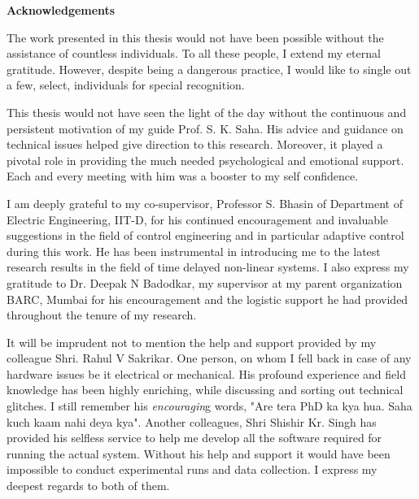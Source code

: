 \doublespacing
\newpage
\thispagestyle{empty}
\mbox{}

\newpage
\thispagestyle{empty}

\begin{center}
\textbf{\Large{Acknowledgements}}
\bigskip
\bigskip
\end{center}

The work presented in this thesis would not have been possible without the assistance
of countless individuals.  To all these people, I extend my eternal gratitude. However, despite being a dangerous practice, I would like to single out a few, select, individuals for special recognition.

 This thesis would not have seen the light of the day without the continuous and persistent motivation of my guide Prof. S. K. Saha. His advice and guidance  on technical  issues helped give direction to this research. Moreover, it played a pivotal role in providing the much needed psychological and emotional support. Each and every meeting with him was a booster to my self confidence. 
 
    
I am deeply grateful to my co-supervisor, Professor S. Bhasin of Department of Electric Engineering, IIT-D, for his continued encouragement and invaluable suggestions in the field of control engineering and in particular adaptive control during this work. He has been instrumental in introducing me to the latest research results  in the field of time delayed non-linear systems.  
I also express my gratitude to Dr. Deepak N Badodkar, my supervisor at my parent organization BARC, Mumbai for his encouragement and the logistic support he had provided throughout the tenure of my research.   


It will be imprudent not to mention the help and support provided by my colleague Shri. Rahul V Sakrikar. One person, on whom I fell back in case of any hardware issues be it electrical or mechanical. His profound experience and field knowledge has been highly enriching,  while discussing and sorting out technical glitches. I still remember his \textit{encouragin}g words, "Are tera PhD ka kya hua. Saha kuch kaam nahi deya kya". Another colleagues, Shri Shishir Kr. Singh has provided his selfless service to help me develop all the software required for running the actual system. Without his help and support it would have been impossible to conduct experimental runs and data collection. I express my deepest regards to both of them.

